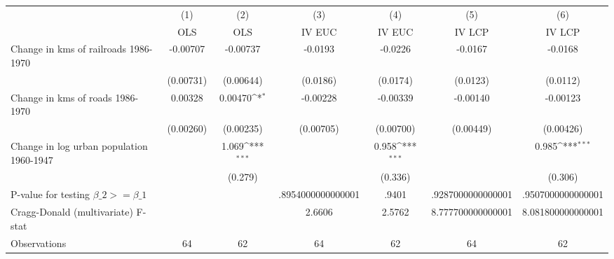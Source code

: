 {
\def\sym#1{\ifmmode^{#1}\else\(^{#1}\)\fi}
\begin{tabular}{l*{6}{c}}
\hline\hline
                &\multicolumn{1}{c}{(1)}&\multicolumn{1}{c}{(2)}&\multicolumn{1}{c}{(3)}&\multicolumn{1}{c}{(4)}&\multicolumn{1}{c}{(5)}&\multicolumn{1}{c}{(6)}\\
                &\multicolumn{1}{c}{OLS}&\multicolumn{1}{c}{OLS}&\multicolumn{1}{c}{IV EUC}&\multicolumn{1}{c}{IV EUC}&\multicolumn{1}{c}{IV LCP}&\multicolumn{1}{c}{IV LCP}\\
\hline
Change in kms of railroads 1986-1970& -0.00707         & -0.00737         &  -0.0193         &  -0.0226         &  -0.0167         &  -0.0168         \\
                &(0.00731)         &(0.00644)         & (0.0186)         & (0.0174)         & (0.0123)         & (0.0112)         \\
[1em]
Change in kms of roads 1986-1970&  0.00328         &  0.00470\sym{*}  & -0.00228         & -0.00339         & -0.00140         & -0.00123         \\
                &(0.00260)         &(0.00235)         &(0.00705)         &(0.00700)         &(0.00449)         &(0.00426)         \\
[1em]
Change in log urban population 1960-1947&                  &    1.069\sym{***}&                  &    0.958\sym{***}&                  &    0.985\sym{***}\\
                &                  &  (0.279)         &                  &  (0.336)         &                  &  (0.306)         \\
\hline
P-value for testing $\beta\_{2} >= \beta\_{1}$&                  &                  &.8954000000000001         &    .9401         &.9287000000000001         &.9507000000000001         \\
Cragg-Donald (multivariate) F-stat&                  &                  &   2.6606         &   2.5762         &8.777700000000001         &8.081800000000001         \\
Observations    &       64         &       62         &       64         &       62         &       64         &       62         \\
\hline\hline
\end{tabular}
}
